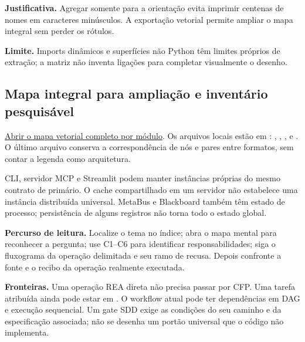 \noindent\textbf{Justificativa.} Agregar somente para a orientação evita imprimir centenas de nomes em caracteres minúsculos. A exportação vetorial permite ampliar o mapa integral sem perder os rótulos.\par

\noindent\textbf{Limite.} Imports dinâmicos e superfícies não Python têm limites próprios de extração; a matriz não inventa ligações para completar visualmente o desenho.\par


\clearpage\subsection*{Mapa integral para ampliação e inventário pesquisável}

\noindent\href{https://github.com/MarceloClaro/opencode-ecosystem-core/blob/codex/core-prontidao-rea/docs/architecture-r911/dependencies.svg}{Abrir o mapa vetorial completo por módulo}. Os arquivos locais estão em : , , ,  e . O último arquivo conserva a correspondência de nós e pares entre formatos, sem contar a legenda como arquitetura.\par

CLI, servidor MCP e Streamlit podem manter instâncias próprias do mesmo contrato de primário. O cache compartilhado em um servidor não estabelece uma instância distribuída universal. MetaBus e Blackboard também têm estado de processo; persistência de alguns registros não torna todo o estado global.

\noindent\textbf{Percurso de leitura.} Localize o tema no índice; abra o mapa mental para reconhecer a pergunta; use C1--C6 para identificar responsabilidades; siga o fluxograma da operação delimitada e seu ramo de recusa. Depois confronte a fonte e o recibo da operação realmente executada.\par

\noindent\textbf{Fronteiras.} Uma operação REA direta não precisa passar por CFP. Uma tarefa atribuída ainda pode estar em . O workflow atual pode ter dependências em DAG e execução sequencial. Um gate SDD exige as condições do seu caminho e da especificação associada; não se desenha um portão universal que o código não implementa.\par


